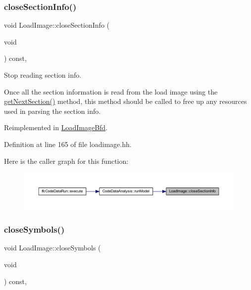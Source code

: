 \subsubsection{\texorpdfstring{closeSectionInfo()}{closeSectionInfo()}}
{\footnotesize\ttfamily void Load\+Image\+::close\+Section\+Info (\begin{DoxyParamCaption}\item[{void}]{ }\end{DoxyParamCaption}) const\hspace{0.3cm}{\ttfamily [inline]}, {\ttfamily [virtual]}}



Stop reading section info. 

Once all the section information is read from the load image using the \mbox{\hyperlink{class_load_image_ab4a927238becd33d8eb75ddc96cc9616}{get\+Next\+Section()}} method, this method should be called to free up any resources used in parsing the section info. 

Reimplemented in \mbox{\hyperlink{class_load_image_bfd_ab09105d243f255c2bece8d27803cb4c5}{Load\+Image\+Bfd}}.



Definition at line 165 of file loadimage.\+hh.

Here is the caller graph for this function\+:
\nopagebreak
\begin{figure}[H]
\begin{center}
\leavevmode
\includegraphics[width=350pt]{class_load_image_a6358439b2aaef7497dad384b7c43213f_icgraph}
\end{center}
\end{figure}
\mbox{\label{class_load_image_a58c86c5342b7500e317ba98bcbf66753}} 
\subsubsection{\texorpdfstring{closeSymbols()}{closeSymbols()}}
{\footnotesize\ttfamily void Load\+Image\+::close\+Symbols (\begin{DoxyParamCaption}\item[{void}]{ }\end{DoxyParamCaption}) const\hspace{0.3cm}{\ttfamily [inline]}, {\ttfamily [virtual]}}



